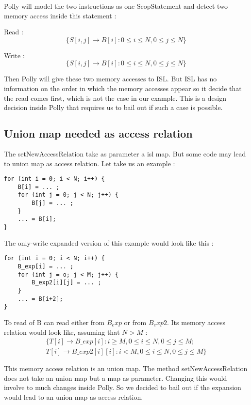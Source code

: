 Polly will model the two instructions as one ScopStatement and detect two memory access inside this statement :

Read :
\[
\{ S[i, j] \rightarrow B[i] : 0 \le i \le N, 0 \le j \le N \}
\]

Write :
\[
\{ S[i, j] \rightarrow B[i] : 0 \le i \le N, 0 \le j \le N \}
\]  
    
Then Polly will give these two memory accesses to ISL. But ISL has no information on the order in which the memory accesses appear so it decide that the read comes first, which is not the case in our example. This is a design decision inside Polly that requires us to bail out if such a case is possible.

\subsection{Union map needed as access relation}
The setNewAccessRelation take as parameter a isl map. But some code may lead to union map as access relation. Let take us an example :

\begin{lstlisting}[frame=single]
for (int i = 0; i < N; i++) {
    B[i] = ... ;
    for (int j = 0; j < N; j++) {
        B[j] = ... ;
    }
    ... = B[i];
}
\end{lstlisting}

The only-write expanded version of this example would look like this :

\begin{lstlisting}[frame=single]
for (int i = 0; i < N; i++) {
    B_exp[i] = ... ;
    for (int j = o; j < M; j++) {
        B_exp2[i][j] = ... ;
    }
    ... = B[i+2];
}
\end{lstlisting}

To read of B can read either from $B_exp$ or from $B_exp2$. Its memory access relation would look like, assuming that $N>M$ :
\begin{gather}
\{ T[i] \rightarrow B\_exp[i] : i \ge M, 0 \le i \le N, 0 \le j \le M ;  \\
T[i] \rightarrow B\_exp2[i][i] : i < M, 0 \le i \le N, 0 \le j \le M \}
\end{gather}

This memory access relation is an union map. The method setNewAccessRelation does not take an union map but a map as parameter. Changing this would involve to much changes inside Polly. So we decided to bail out if the expansion would lead to an union map as access relation.

